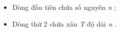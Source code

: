 \begin{itemize}
	\item Dòng đầu tiên chứa số nguyên \emph{ n } ;
	\item Dòng thứ 2 chứa xâu \emph{ T } độ dài \emph{ n } .
\end{itemize}